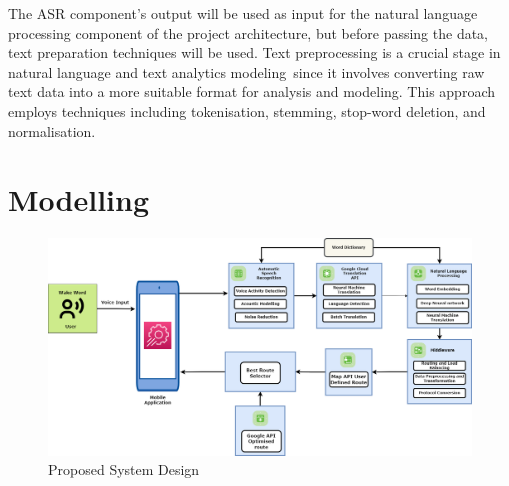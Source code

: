 \documentclass{epsrc}
\begin{document}
The ASR component's output will be used as input for the natural language processing component of the project architecture, but before passing the data, text preparation techniques will be used. Text preprocessing is a crucial stage in natural language and text analytics modeling since it involves converting raw text data into a more suitable format for analysis and modeling. This approach employs techniques including tokenisation, stemming, stop-word deletion, and normalisation. 
\vspace{5pt}

\section{Modelling}

\begin{figure}[hbtp]
    \centering
    \includegraphics[width=17cm]{archi (1).png}
    \caption{Proposed System Design}
    \label{fig:Architecture}
\end{figure}
\vspace{5pt}
\end{document}

